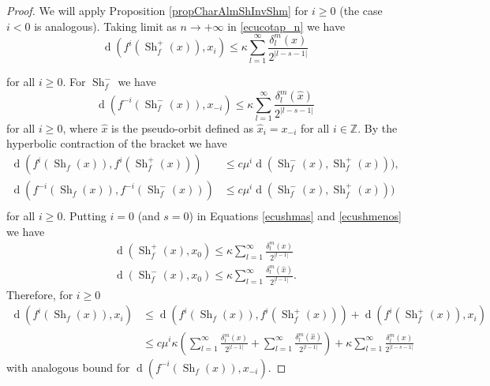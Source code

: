 \documentclass[12pt]{amsart}
\theoremstyle{plain}
\theoremstyle{definition}
\theoremstyle{remark}
\DeclareMathOperator{\dist}{d}
\DeclareMathOperator{\shm}{Sh}
\newcommand{\Z}{\mathbb Z}
\begin{document}
\begin{proof}
We will apply Proposition \ref{propCharAlmShInvShm} for $i\geq 0$ (the case $i<0$ is analogous).
	Taking limit as $n\to+\infty$ in \eqref{ecucotap_n} we have
	\begin{equation}
		\label{ecushmas}
	\dist(f^i(\shm_f^+(x)),x_i)\leq \kappa \sum_{l=1}^\infty\frac{\delta_l^m(x)}{2^{|l-s-1|}}
	\end{equation}

	for all $i\geq 0$.
	For $\shm_f^-$ we have
	\begin{equation}
		\label{ecushmenos}
		\dist(f^{-i}(\shm_f^-(x)),x_{-i})\leq \kappa \sum_{l=1}^\infty\frac{\delta_l^m(\hat x)}{2^{|l-s-1|}}
	\end{equation}
	for all $i\geq 0$, where $\hat x$ is the pseudo-orbit defined as $\hat x_i=x_{-i}$ for all $i\in\Z$.
	By the hyperbolic contraction of the bracket we have
	\begin{align*}
		\dist(f^i(\shm_f(x)),f^i(\shm^+_f(x)))
		&\leq c\mu^i\dist(\shm^-_f(x),\shm^+_f(x))),\\
		\dist(f^{-i}(\shm_f(x)),f^{-i}(\shm^-_f(x)))
		&\leq c\mu^i\dist(\shm^-_f(x),\shm^+_f(x)))\\
	\end{align*}
	for all $i\geq 0$.
	Putting $i=0$ (and $s=0$) in Equations \eqref{ecushmas} and \eqref{ecushmenos} we have
	\begin{align*}
		\dist(\shm_f^+(x),x_0)\leq \kappa \sum_{l=1}^\infty\frac{\delta_l^m(x)}{2^{|l-1|}}\\
		\dist(\shm_f^-(x),x_0)\leq \kappa \sum_{l=1}^\infty\frac{\delta_l^m(\hat x)}{2^{|l-1|}}.
	\end{align*}
	Therefore, for $i\geq 0$
	\begin{align*}
		\dist(f^i(\shm_f(x)),x_i)
		&\leq
		\dist(f^i(\shm_f(x)),f^i(\shm_f^+(x)))+
		\dist(f^i(\shm_f^+(x)),x_i)
		\\
		&\leq
		c\mu^i\kappa
		\left(
		\sum_{l=1}^\infty\frac{\delta_l^m(x)}{2^{|l-1|}}
		+
		\sum_{l=1}^\infty\frac{\delta_l^m(\hat x)}{2^{|l-1|}}
		\right)
		+
		\kappa \sum_{l=1}^\infty\frac{\delta_l^m(x)}{2^{|l-s-1|}}
	\end{align*}
	with analogous bound for
	$\dist(f^{-i}(\shm_f(x)),x_{-i})$.


\end{proof}
\end{document}
